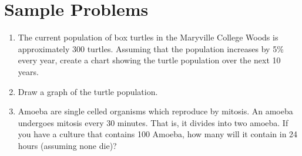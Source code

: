 \documentclass{article}
\begin{document}
\section{Sample Problems}
\begin{enumerate}
    \item The current population of box turtles in the Maryville
        College Woods is approximately 300 turtles.  Assuming that the
        population increases by 5\% every year, create a chart showing
        the turtle population over the next 10 years.
    \item Draw a graph of the turtle population.
    \item Amoeba are single celled organisms which reproduce by
        mitosis.  An amoeba undergoes mitosis every 30 minutes.  That
        is, it divides into two amoeba.  If you have a culture that
        contains 100 Amoeba, how many will it contain in 24 hours
        (assuming none die)?
\end{enumerate}
\end{document}
